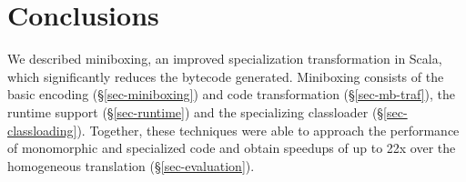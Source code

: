 \section{Conclusions}
\label{sec-conclusions}
We described miniboxing, an improved specialization transformation in Scala, which significantly reduces the bytecode generated. Miniboxing consists of the basic encoding (\S\ref{sec-miniboxing}) and code transformation (\S\ref{sec-mb-traf}), the runtime support (\S\ref{sec-runtime}) and the specializing classloader (\S\ref{sec-classloading}). Together, these techniques were able to approach the performance of monomorphic and specialized code and obtain speedups of up to 22x over the homogeneous translation (\S\ref{sec-evaluation}). 
